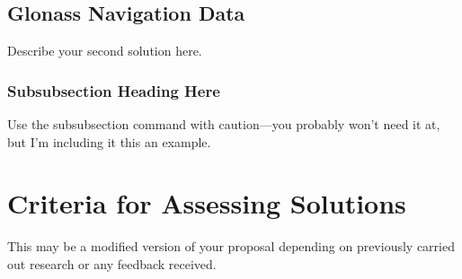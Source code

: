 \documentclass[a4paper, 10pt]{article}
\begin{document}
\begin{multicols}{2}
\subsection{Glonass Navigation Data}
Describe your second solution here.
\subsubsection{Subsubsection Heading Here}
Use the subsubsection command with caution---you probably won't need it at, but I'm including it this an example.

\section{Criteria for Assessing Solutions} \label{sec:criteria}
This may be a modified version of your proposal depending on previously carried out research or any feedback received.  

\end{multicols}

\end{document}
